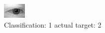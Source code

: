 \begin{figure}[h!]
\begin{center}
\includegraphics[width=0.60\columnwidth]{figures/ID498_class_1_target_2.png}
\end{center}
\caption{ Classification: 1 actual target: 2}
\label{fig:ID498_class_1_target_2}
\end{figure}
